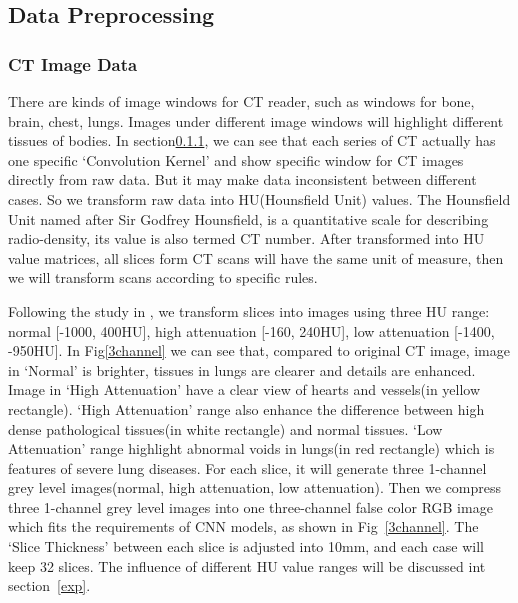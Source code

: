 \documentclass[runningheads]{llncs}
\begin{document}
\subsection{Data Preprocessing}
\label{preprocessing}
\subsubsection{CT Image Data}
\label{ctimagedata}
There are kinds of image windows for CT reader, such as windows for bone, brain, chest, lungs. Images under different image windows will highlight different tissues of bodies.
In section\ref{ctimagedata}, we can see that each series of CT actually has one specific `Convolution Kernel' and show specific window for CT images directly from raw data. But it may make data inconsistent between different cases. So we transform raw data into HU(Hounsfield Unit) values. The Hounsfield Unit named after Sir Godfrey Hounsfield, is a quantitative scale for describing radio-density, its value is also termed CT number. After transformed into HU value matrices, all slices form CT scans will have the same unit of measure, then we will transform scans according to specific rules.

Following the study in \cite{Shin2017Three} \cite{gao2018holistic}, we transform slices into images using three HU range: normal [-1000, 400HU], high attenuation [-160, 240HU], low attenuation [-1400, -950HU]. In Fig\ref{3channel} we can see that, compared to original CT image, image in `Normal' is brighter, tissues in lungs are clearer and details are enhanced. Image in `High Attenuation' have a clear view of hearts and vessels(in yellow rectangle). `High Attenuation' range also enhance the difference between high dense pathological tissues(in white rectangle) and normal tissues. `Low Attenuation' range highlight abnormal voids in lungs(in red rectangle) which is features of severe lung diseases. 
For each slice, it will generate three 1-channel grey level images(normal, high attenuation, low attenuation). Then we compress three 1-channel grey level images into one three-channel false color RGB image which fits the requirements of CNN models, as shown in Fig~\ref{3channel}. The `Slice Thickness' between each slice is adjusted into 10mm, and each case will keep 32 slices.
The influence of different HU value ranges will be discussed int section~\ref{exp}.
\end{document}

